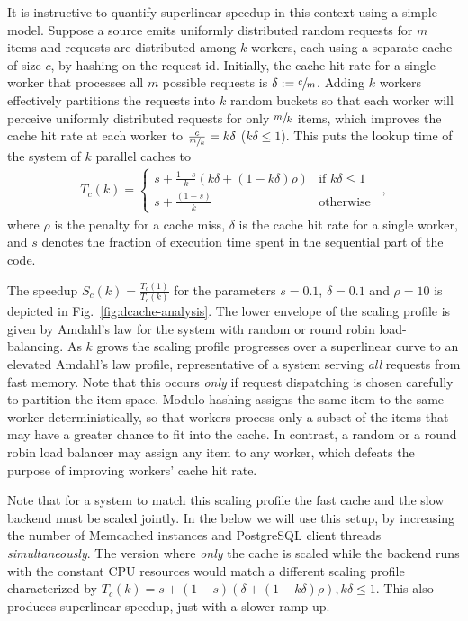 It is instructive to quantify superlinear speedup in this context using a simple model. Suppose a source emits uniformly distributed random requests for $m$ items and requests are distributed among $k$ workers, each using a separate cache of size $c$, by hashing on the request id.  Initially, the cache hit rate for a single worker that processes all $m$ possible requests is $\delta := \sfrac{c}{m}$. Adding $k$ workers effectively partitions the requests into $k$ random buckets so that each worker will perceive uniformly distributed requests for only $\sfrac{m}{k}$ items, which improves the cache hit rate at each worker to $\frac{c}{\sfrac{m}{k}} = k\delta$ ($k\delta \le 1$). This puts the lookup time of the system of $k$ parallel caches to
\begin{align}\label{eq:dist-cache}
  T_c(k) = \begin{cases} s + \frac{1-s}{k}(k\delta + (1-k\delta)\rho) & \text{if } k\delta \le 1\\s + \frac{(1-s)}{k} & \text{otherwise}\end{cases} \enspace ,
\end{align}
where $\rho$ is the penalty for a cache miss, $\delta$ is the cache hit rate for a single worker, and $s$ denotes the fraction of execution time spent in the sequential part of the code.


The speedup $S_c(k)=\frac{T_c(1)}{T_c(k)}$ for the parameters $s=0.1$, $\delta=0.1$ and $\rho=10$ is depicted in Fig.~\ref{fig:dcache-analysis}. The lower envelope of the scaling profile is given by Amdahl's law for the system with random or round robin load-balancing. %
As $k$ grows the scaling profile progresses over a superlinear curve to an elevated Amdahl's law profile, representative of a system serving \emph{all} requests from fast memory. %
Note that this occurs \emph{only} if request dispatching is chosen carefully to partition the item space. Modulo hashing assigns the same item to the same worker deterministically, so that workers process only a subset of the items that may have a greater chance to fit into the cache. In contrast, a random or a round robin load balancer may assign any item to any worker, which defeats the purpose of improving workers' cache hit rate. %

Note that for a system to match this scaling profile the fast cache and the slow backend must be scaled jointly. In the below we will use this setup, by increasing the number of Memcached instances and PostgreSQL client threads \emph{simultaneously}. The version where \emph{only} the cache is scaled while the backend runs with the constant CPU resources would match a different scaling profile characterized by $T_c(k) = s + (1-s)(\delta + (1-k\delta)\rho), k\delta \le 1$. This also produces superlinear speedup, just with a slower ramp-up.

